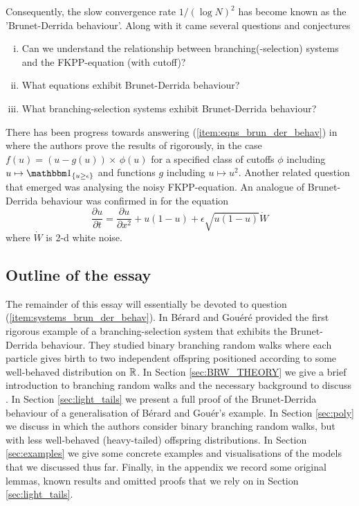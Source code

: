 Consequently, the slow convergence rate $1 / (\log N)^2$ has become known as the 'Brunet-Derrida behaviour'. Along with it came several questions and conjectures
\begin{enumerate}[(i)]
\item \vspace{-2mm}Can we understand the relationship between branching(-selection) systems and the FKPP-equation (with cutoff)? 
\item \vspace{-2mm}What equations exhibit Brunet-Derrida behaviour? \label{item:eqns_brun_der_behav}
\item \vspace{-2mm}What branching-selection systems exhibit Brunet-Derrida behaviour? \label{item:systems_brun_der_behav}
\end{enumerate}{}
There has been progress towards answering (\ref{item:eqns_brun_der_behav}) in \cite{dumortier2007critical} where the authors prove the results of \cite{brunet1997shift} rigorously, in the case $f(u) = (u - g(u)) \times\,\phi(u)$ for a specified class of cutoffs $\phi$ including $u \mapsto \Ind_{\{ u \geq \epsilon\}}$ and functions $g$ including $u \mapsto u^2$. Another related question that emerged was analysing the noisy FKPP-equation. An analogue of Brunet-Derrida behaviour was confirmed in \cite{mueller2011effect} for the equation
\begin{equation}\nonumber
\frac{\partial u}{\partial t} = \frac{\partial u}{\partial x^2} + u(1 - u) + \epsilon \sqrt{u(1 - u)} \dot{W}
\end{equation}
where $\dot{W}$ is 2-d white noise. \\


\subsection{Outline of the essay}
The remainder of this essay will essentially be devoted to question (\ref{item:systems_brun_der_behav}). In \cite{exp_tails} Bérard and Gouéré provided the first rigorous example of a branching-selection system that exhibits the Brunet-Derrida behaviour. They studied binary branching random walks where each particle gives birth to two independent offspring positioned according to some well-behaved distribution on $\mathbb{R}$. In Section \ref{sec:BRW_THEORY} we give a brief introduction to branching random walks and the necessary background to discuss \cite{exp_tails}. In Section \ref{sec:light_tails} we present a full proof of the Brunet-Derrida behaviour of a generalisation of Bérard and Gouér's example. In Section \ref{sec:poly} we discuss \cite{poly_tails} in which the authors consider binary branching random walks, but with less well-behaved (heavy-tailed) offspring distributions. In Section \ref{sec:examples} we give some concrete examples and visualisations of the models that we discussed thus far. Finally, in the appendix we record some original lemmas, known results and omitted proofs that we rely on in Section \ref{sec:light_tails}. 

\newpage